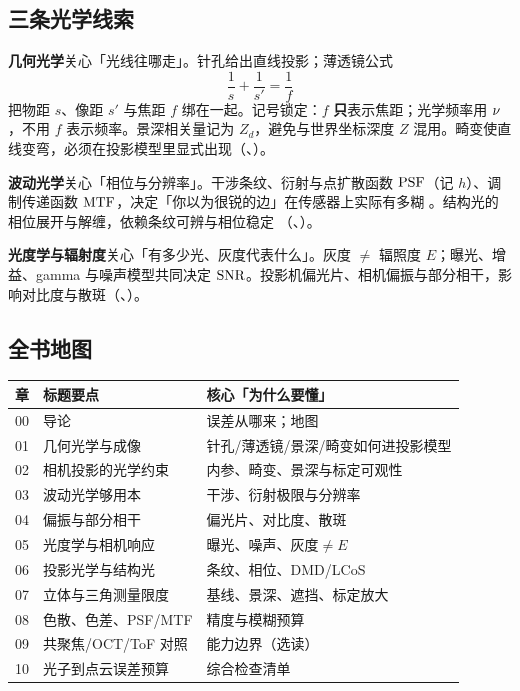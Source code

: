 \subsection{三条光学线索}

\textbf{几何光学}关心「光线往哪走」。针孔给出直线投影；薄透镜公式
\[
\frac{1}{s}+\frac{1}{s'}=\frac{1}{f}
\]
把物距 $s$、像距 $s'$ 与焦距 $f$ 绑在一起。记号锁定：$f$ \textbf{只}表示焦距；光学频率用 $\nu$，不用 $f$ 表示频率。景深相关量记为 $Z_d$，避免与世界坐标深度 $Z$ 混用。畸变使直线变弯，必须在投影模型里显式出现（、）。

\textbf{波动光学}关心「相位与分辨率」。干涉条纹、衍射与点扩散函数 $\mathrm{PSF}$（记 $h$）、调制传递函数 $\mathrm{MTF}$，决定「你以为很锐的边」在传感器上实际有多糊 \citep{GoodmanFourierOptics,BornWolf}。结构光的相位展开与解缠，依赖条纹可辨与相位稳定 \citep{GhigliaPritt1998}（、）。

\textbf{光度学与辐射度}关心「有多少光、灰度代表什么」。灰度 $\neq$ 辐照度 $E$；曝光、增益、gamma 与噪声模型共同决定 $\mathrm{SNR}$。投影机偏光片、相机偏振与部分相干，影响对比度与散斑（、）。

\subsection{全书地图}

\begin{center}
\begin{tabular}{@{}clp{}@{}}
\toprule
章 & 标题要点 & 核心「为什么要懂」 \\
\midrule
00 & 导论 & 误差从哪来；地图 \\
01 & 几何光学与成像 & 针孔/薄透镜/景深/畸变如何进投影模型 \\
02 & 相机投影的光学约束 & 内参、畸变、景深与标定可观性 \\
03 & 波动光学够用本 & 干涉、衍射极限与分辨率 \\
04 & 偏振与部分相干 & 偏光片、对比度、散斑 \\
05 & 光度学与相机响应 & 曝光、噪声、灰度$\neq E$ \\
06 & 投影光学与结构光 & 条纹、相位、DMD/LCoS \\
07 & 立体与三角测量限度 & 基线、景深、遮挡、标定放大 \\
08 & 色散、色差、PSF/MTF & 精度与模糊预算 \\
09 & 共聚焦/OCT/ToF 对照 & 能力边界（选读） \\
10 & 光子到点云误差预算 & 综合检查清单 \\
\bottomrule
\end{tabular}
\end{center}

